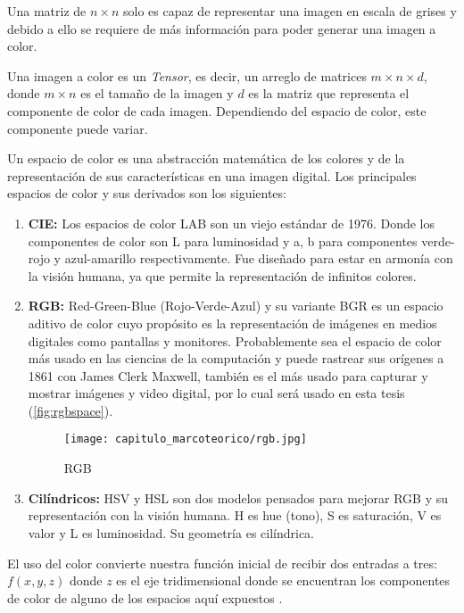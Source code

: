 Una matriz de \(n \times n\) solo es capaz de representar una imagen en escala
de grises y debido a ello se requiere de más información para poder generar una
imagen a color.

Una imagen a color es un \emph{Tensor}, es decir, un arreglo de matrices \(m
\times n \times d\), donde \(m \times n\) es el tamaño de la imagen y \(d\) es
la matriz que representa el componente de color de cada imagen. Dependiendo del
espacio de color, este componente puede variar.

Un espacio de color es una abstracción matemática de los colores y de la
representación de sus características en una imagen digital. Los principales
espacios de color y sus derivados son los siguientes:

\begin{enumerate}
    \item{\textbf{CIE:}} Los espacios de color LAB son un viejo estándar de
    1976. Donde los componentes de color son L para luminosidad y a, b para
    componentes verde-rojo y azul-amarillo respectivamente. Fue diseñado para
    estar en armonía con la visión humana, ya que permite la representación de
    infinitos colores.

    \item{\textbf{RGB:}} Red-Green-Blue (Rojo-Verde-Azul) y su variante BGR es
    un espacio aditivo de color cuyo propósito es la representación de imágenes
    en medios digitales como pantallas y monitores. Probablemente sea el espacio
    de color más usado en las ciencias de la computación y puede rastrear sus
    orígenes a 1861 con James Clerk Maxwell, también es el más usado para
    capturar y mostrar imágenes y video digital, por lo cual será usado en esta
    tesis (\autoref{fig:rgbspace}). 

    \begin{figure}[H]
        \centering
        \texttt{[image: capitulo\_marcoteorico/rgb.jpg]}
        \caption{RGB}\label{fig:rgbspace}
    \end{figure}

    \item{\textbf{Cilíndricos:}} HSV y HSL son dos modelos pensados para mejorar
    RGB y su representación con la visión humana. H es hue (tono), S es
    saturación, V es valor y L es luminosidad. Su geometría es cilíndrica.
\end{enumerate}

El uso del color convierte nuestra función inicial de recibir dos entradas a
tres: \(f(x,y,z)\) donde \(z\) es el eje tridimensional donde se encuentran los
componentes de color de alguno de los espacios aquí expuestos \cite{Vernon1991}.

